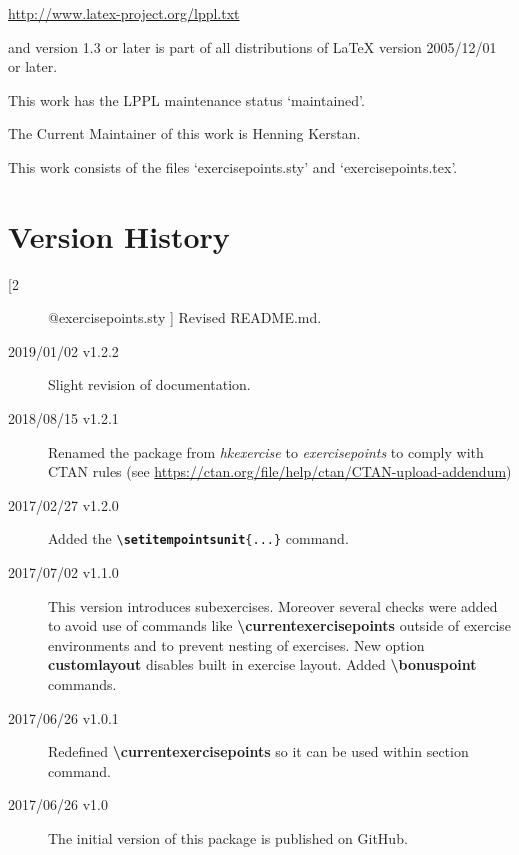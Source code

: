 \documentclass[
  twocolumn,%
  fontsize=9pt,%
  DIV=calc,%
  numbers=noendperiod%
]{scrartcl}
\makeatletter
\newcommand{\emphstyle}{\ttfamily\color{NavyBlue}\bfseries}%
\newcommand{\keyword}[1]{{\emphstyle#1}}%
\newcommand{\packageversion}{\StrBefore[2]{\expandafter\csname ver@exercisepoints.sty\endcsname}{ }}
\makeatother
\begin{document}
   \url{http://www.latex-project.org/lppl.txt}\medskip

\noindent and version 1.3 or later is part of all distributions of LaTeX version 2005/12/01 or later.\medskip

\noindent This work has the LPPL maintenance status `maintained'.\medskip

\noindent The Current Maintainer of this work is Henning Kerstan.\medskip

\noindent This work consists of the files `exercisepoints.sty' and `exercisepoints.tex'.


\section{Version History}
\begin{description}
\item[\packageversion] Revised README.md.
\item[2019/01/02 v1.2.2] Slight revision of documentation.
\item[2018/08/15 v1.2.1] Renamed the package from \emph{hkexercise} to \emph{exercisepoints} to comply with CTAN rules (see \url{https://ctan.org/file/help/ctan/CTAN-upload-addendum})
\item[2017/02/27 v1.2.0] Added the \texttt{\textbackslash\keyword{setitempointsunit}\{...\}} command.
\item[2017/07/02 v1.1.0] This version introduces subexercises. Moreover several checks were added to avoid use of commands like \textcolor{NavyBlue}{\ttfamily\bfseries\textbackslash currentexercisepoints} outside of exercise environments and to prevent nesting of exercises. New option \textcolor{NavyBlue}{\ttfamily\bfseries customlayout} disables built in exercise layout. Added \textcolor{NavyBlue}{\ttfamily\bfseries\textbackslash bonuspoint} commands.
\item[2017/06/26 v1.0.1] Redefined \textcolor{NavyBlue}{\ttfamily\bfseries\textbackslash currentexercisepoints} so it can be used within section command. 
\item[2017/06/26 v1.0] The initial version of this package is published on GitHub.
\end{description}
\end{document}
